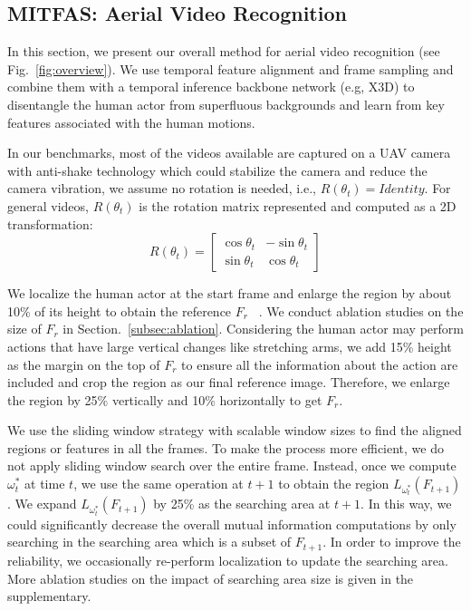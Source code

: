 \documentclass[10pt,twocolumn,letterpaper]{article}
\begin{document}
{\subsection{MITFAS: Aerial Video Recognition} \label{subsec:MITFAS}
In this section, we present our overall method for aerial video recognition (see Fig.~\ref{fig:overview}). We use temporal feature alignment and frame sampling and combine them with a temporal inference backbone network (e.g, X3D\cite{feichtenhofer2020x3d}) to disentangle the human actor from superfluous backgrounds and learn from key features associated with the human motions.



In our benchmarks, most of the videos available are captured on a UAV camera with anti-shake technology which could stabilize the camera and reduce the camera vibration, we assume no rotation is needed, i.e., $R(\theta_t)=Identity$. For general videos, $R(\theta_t)$ is the rotation matrix represented and computed as a 2D transformation:
\begin{equation}
    R(\theta_t) = \begin{bmatrix}
        \cos\theta_t & -\sin\theta_t\\
        \sin\theta_t & \cos\theta_t
    \end{bmatrix}
\end{equation}

We localize the human actor at the start frame and enlarge the region by about 10\% of its height to obtain the reference $F_r$ ~\cite{hasan2021generalizable}. We conduct ablation studies on the size of $F_r$ in Section.~\ref{subsec:ablation}. Considering the human actor may perform actions that have large vertical changes like stretching arms, we add 15\% height as the margin on the top of $F_r$ to ensure all the information about the action are included and crop the region as our final reference image. Therefore, we enlarge the region by 25\% vertically and 10\% horizontally to get $F_r$.

We use the sliding window strategy with scalable window sizes to find the aligned regions or features in all the frames. To make the process more efficient, we do not apply sliding window search over the entire frame. Instead, once we compute $\omega_t^*$ at time $t$, we use the same operation at $t+1$ to obtain the region $L_{\omega_t^*}(F_{t+1})$. We expand  $L_{\omega_t^*}(F_{t+1})$ by 25\% as the searching area at $t+1$. In this way, we could significantly decrease the overall mutual information computations by only searching in the searching area which is a subset of $F_{t+1}$. In order to improve the reliability, we occasionally re-perform localization to update the searching area. More ablation studies on the impact of searching area size is given in the supplementary.

}
\end{document}
